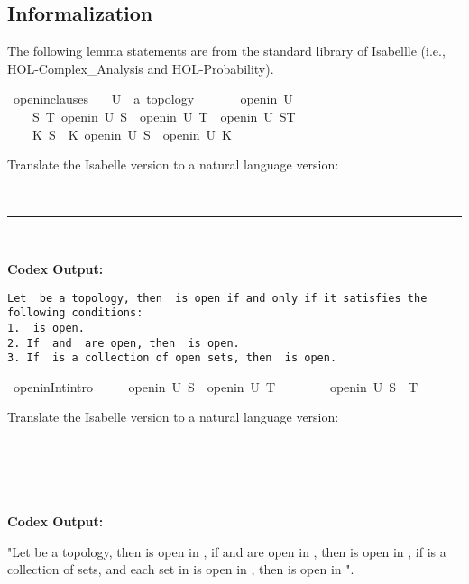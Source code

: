 \documentclass{article}
\begin{document}
\subsection{Informalization}
\label{appendix:advanced_informal}
The following lemma statements are from the standard library of Isabellle (i.e., HOL-Complex\_Analysis and HOL-Probability).
\begin{boxB}
\begin{isabelle}
\isamarkupfalse \ openin{\isacharunderscore}{\kern0pt}clauses{\isacharcolon}{\kern0pt}\isanewline
\ \ \ U\ {\isacharcolon}{\kern0pt}{\isacharcolon}{\kern0pt}\ {\isachardoublequoteopen}{\isacharprime}{\kern0pt}a\ topology{\isachardoublequoteclose}\isanewline
\ \ \isanewline
\ \ \ \ {\isachardoublequoteopen}openin\ U\ {\isacharbraceleft}{\kern0pt}{\isacharbraceright}{\kern0pt}{\isachardoublequoteclose}\isanewline
\ \ \ \ {\isachardoublequoteopen}{\isasymAnd}S\ T{\isachardot}{\kern0pt}\ openin\ U\ S\ {\isasymLongrightarrow}\ openin\ U\ T\ {\isasymLongrightarrow}\ openin\ U\ {\isacharparenleft}{\kern0pt}S{\isasyminter}T{\isacharparenright}{\kern0pt}{\isachardoublequoteclose}\isanewline
\ \ \ \ {\isachardoublequoteopen}{\isasymAnd}K{\isachardot}{\kern0pt}\ {\isacharparenleft}{\kern0pt}{\isasymforall}S\ {\isasymin}\ K{\isachardot}{\kern0pt}\ openin\ U\ S{\isacharparenright}{\kern0pt}\ {\isasymLongrightarrow}\ openin\ U\ {\isacharparenleft}{\kern0pt}{\isasymUnion}K{\isacharparenright}{\kern0pt}{\isachardoublequoteclose}
\end{isabelle}
Translate the Isabelle version to a natural language version:

\
\hrule
\

\textbf{Codex Output:}
\begin{lstlisting}
Let  be a topology, then  is open if and only if it satisfies the following conditions:
1.  is open.
2. If  and  are open, then  is open.
3. If  is a collection of open sets, then  is open.
\end{lstlisting}
\end{boxB}

\begin{boxB}
\begin{isabelle}
\isamarkupfalse \ openin{\isacharunderscore}{\kern0pt}Int{\isacharbrackleft}{\kern0pt}intro{\isacharbrackright}{\kern0pt}{\isacharcolon}{\kern0pt}\ \isanewline
\ \ \ \ {\isachardoublequoteopen}openin\ U\ S\ {\isasymLongrightarrow}\ openin\ U\ T\ \isanewline
\ \ \ \ \ \ {\isasymLongrightarrow}\ openin\ U\ {\isacharparenleft}{\kern0pt}S\ {\isasyminter}\ T{\isacharparenright}{\kern0pt}{\isachardoublequoteclose}
\end{isabelle}
Translate the Isabelle version to a natural language version:

\
\hrule
\

\textbf{Codex Output:}

"Let  be a topology, then  is open in , if  and  are open in , then  is open in , if  is a collection of sets, and each set in  is open in , then  is open in ".
\end{boxB}
\end{document}

